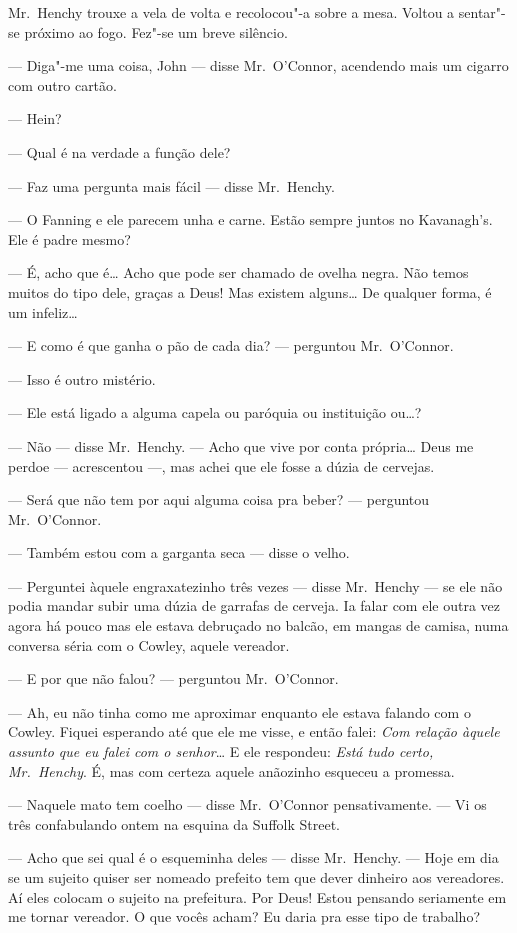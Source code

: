 Mr.~Henchy trouxe a vela de volta e recolocou"-a sobre a mesa.  Voltou a
sentar"-se próximo ao fogo.  Fez"-se um breve silêncio.

--- Diga"-me uma coisa, John --- disse Mr.~O’Connor, acendendo mais um cigarro
com outro cartão.

--- Hein?

--- Qual é na verdade a função dele?

--- Faz uma pergunta mais fácil --- disse Mr.~Henchy.

--- O Fanning e ele parecem unha e carne.  Estão sempre juntos no Kavanagh’s.
Ele é padre mesmo?

--- É, acho que é\ldots{} Acho que pode ser chamado de ovelha negra.  Não temos
muitos do tipo dele, graças a Deus!  Mas existem alguns\ldots{} De qualquer
forma, é um infeliz\ldots{}

--- E como é que ganha o pão de cada dia? --- perguntou Mr.~O’Connor.

--- Isso é outro mistério.

--- Ele está ligado a alguma capela ou paróquia ou instituição ou\ldots{}?

--- Não --- disse Mr.~Henchy.  --- Acho que vive por conta própria\ldots{} Deus
me perdoe --- acrescentou ---, mas achei que ele fosse a dúzia de cervejas.

--- Será que não tem por aqui alguma coisa pra beber? --- perguntou Mr.~O’Connor.

--- Também estou com a garganta seca --- disse o velho.

--- Perguntei àquele engraxatezinho três vezes --- disse Mr.~Henchy --- se
ele não podia mandar subir uma dúzia de garrafas de cerveja.  Ia falar com ele
outra vez agora há pouco mas ele estava debruçado no balcão, em mangas de
camisa, numa conversa séria com o Cowley, aquele vereador.

--- E por que não falou? --- perguntou Mr.~O’Connor.

--- Ah, eu não tinha como me aproximar enquanto ele estava falando com o
Cowley.  Fiquei esperando até que ele me visse, e então falei: \textit{Com
relação àquele assunto que eu falei com o senhor}\ldots{} E ele
respondeu: \textit{Está tudo certo, Mr.~Henchy}.  É, mas com certeza
aquele anãozinho esqueceu a promessa.

--- Naquele mato tem coelho --- disse Mr.~O’Connor pensativamente.  --- Vi os
três confabulando ontem na esquina da Suffolk Street.

--- Acho que sei qual é o esqueminha deles --- disse Mr.~Henchy.  --- Hoje em
dia se um sujeito quiser ser nomeado prefeito tem que dever dinheiro aos
vereadores.  Aí eles colocam o sujeito na prefeitura.  Por Deus!  Estou
pensando seriamente em me tornar vereador.  O que vocês acham?  Eu daria pra
esse tipo de trabalho?

